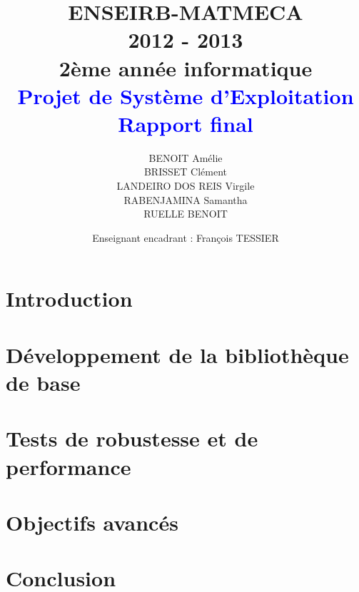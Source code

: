 \documentclass[a4paper,12pt]{article}
\title{
	\normalsize{ENSEIRB-MATMECA \\ 
	2012 - 2013 \\
	2ème année informatique} \\
	\vspace{15mm}
	\Huge{\textcolor{blue}{Projet de Système d'Exploitation \\ Rapport final }}
}
\author{ BENOIT Amélie \\ BRISSET Clément \\ LANDEIRO DOS REIS Virgile \\ RABENJAMINA Samantha \\ RUELLE BENOIT}
\date{
	\normalsize{Enseignant encadrant : François TESSIER}
}
\begin{document}
\maketitle

\clearpage

\section{Introduction }



\section{Développement de la bibliothèque de base}



\section{Tests de robustesse et de performance}



\section{Objectifs avancés}



\clearpage
\section{Conclusion}
\end{document}
